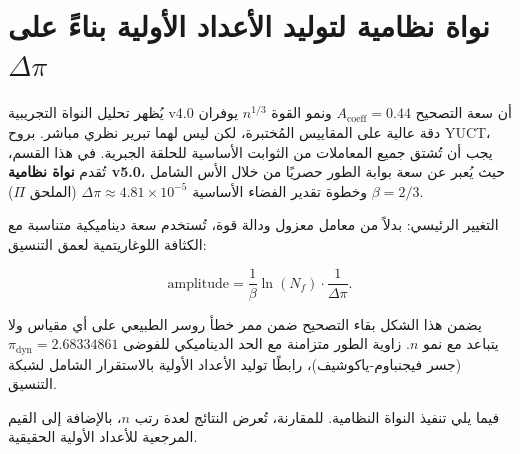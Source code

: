 \documentclass[12pt,a4paper]{article}
\begin{document}
	\small
	\section{نواة نظامية لتوليد الأعداد الأولية بناءً على \(\Delta\pi\)}
	\label{sec:systemic-prime}
	
	يُظهر تحليل النواة التجريبية v4.0 أن سعة التصحيح \(A_{\text{coeff}} = 0.44\) ونمو القوة \(n^{1/3}\) يوفران دقة عالية على المقاييس المُختبرة، لكن ليس لهما تبرير نظري مباشر. بروح YUCT، يجب أن تُشتق جميع المعاملات من الثوابت الأساسية للحلقة الجبرية. في هذا القسم، تُقدم \textbf{نواة نظامية v5.0}، حيث يُعبر عن سعة بوابة الطور حصريًا من خلال الأس الشامل \(\beta = 2/3\) وخطوة تقدير الفضاء الأساسية \(\Delta\pi \approx 4.81 \times 10^{-5}\) (الملحق \(\Pi\)).
	
	التغيير الرئيسي: بدلاً من معامل معزول ودالة قوة، تُستخدم سعة ديناميكية متناسبة مع الكثافة اللوغاريتمية لعمق التنسيق:
	
	\[
	\text{amplitude} = \frac{1}{\beta} \ln(N_f) \cdot \frac{1}{\Delta\pi}.
	\]
	
	يضمن هذا الشكل بقاء التصحيح ضمن ممر خطأ روسر الطبيعي على أي مقياس ولا يتباعد مع نمو \(n\). زاوية الطور متزامنة مع الحد الديناميكي للفوضى \(\pi_{\text{dyn}} = 2.68334861\) (جسر فيجنباوم-ياكوشيف)، رابطًا توليد الأعداد الأولية بالاستقرار الشامل لشبكة التنسيق.
	
	فيما يلي تنفيذ النواة النظامية. للمقارنة، تُعرض النتائج لعدة رتب \(n\)، بالإضافة إلى القيم المرجعية للأعداد الأولية الحقيقية.
	
\end{document}
